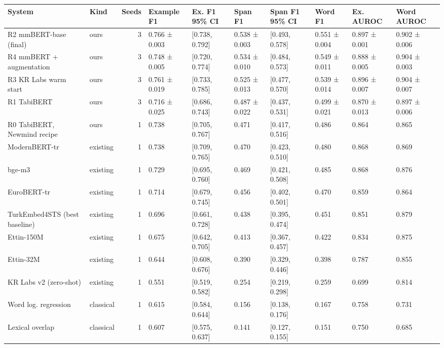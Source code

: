 \begin{tabular}{llrlllllll}
\toprule
System & Kind & Seeds & Example F1 & Ex. F1 95\% CI & Span F1 & Span F1 95\% CI & Word F1 & Ex. AUROC & Word AUROC \\
\midrule
R2 mmBERT-base (final) & ours & 3 & 0.766 ± 0.003 & [0.738, 0.792] & 0.538 ± 0.003 & [0.493, 0.578] & 0.551 ± 0.004 & 0.897 ± 0.001 & 0.902 ± 0.006 \\
R4 mmBERT + augmentation & ours & 3 & 0.748 ± 0.005 & [0.720, 0.774] & 0.534 ± 0.010 & [0.484, 0.573] & 0.549 ± 0.011 & 0.888 ± 0.005 & 0.904 ± 0.003 \\
R3 KR Labs warm start & ours & 3 & 0.761 ± 0.019 & [0.733, 0.785] & 0.525 ± 0.013 & [0.477, 0.570] & 0.539 ± 0.014 & 0.896 ± 0.007 & 0.904 ± 0.007 \\
R1 TabiBERT & ours & 3 & 0.716 ± 0.025 & [0.686, 0.743] & 0.487 ± 0.022 & [0.437, 0.531] & 0.499 ± 0.021 & 0.870 ± 0.013 & 0.897 ± 0.006 \\
R0 TabiBERT, Newmind recipe & ours & 1 & 0.738 & [0.705, 0.767] & 0.471 & [0.417, 0.516] & 0.486 & 0.864 & 0.865 \\
ModernBERT-tr & existing & 1 & 0.738 & [0.709, 0.765] & 0.470 & [0.423, 0.510] & 0.480 & 0.868 & 0.869 \\
bge-m3 & existing & 1 & 0.729 & [0.695, 0.760] & 0.469 & [0.421, 0.508] & 0.485 & 0.868 & 0.876 \\
EuroBERT-tr & existing & 1 & 0.714 & [0.679, 0.745] & 0.456 & [0.402, 0.501] & 0.470 & 0.859 & 0.864 \\
TurkEmbed4STS (best baseline) & existing & 1 & 0.696 & [0.661, 0.728] & 0.438 & [0.395, 0.474] & 0.451 & 0.851 & 0.879 \\
Ettin-150M & existing & 1 & 0.675 & [0.642, 0.705] & 0.413 & [0.367, 0.457] & 0.422 & 0.834 & 0.875 \\
Ettin-32M & existing & 1 & 0.644 & [0.608, 0.676] & 0.390 & [0.329, 0.446] & 0.398 & 0.787 & 0.855 \\
KR Labs v2 (zero-shot) & existing & 1 & 0.551 & [0.519, 0.582] & 0.254 & [0.219, 0.298] & 0.259 & 0.699 & 0.814 \\
Word log. regression & classical & 1 & 0.615 & [0.584, 0.644] & 0.156 & [0.138, 0.176] & 0.167 & 0.758 & 0.731 \\
Lexical overlap & classical & 1 & 0.607 & [0.575, 0.637] & 0.141 & [0.127, 0.155] & 0.151 & 0.750 & 0.685 \\
\bottomrule
\end{tabular}
